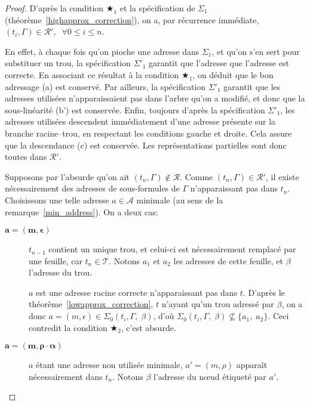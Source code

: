 \documentclass[11pt,a4paper]{article}
\theoremstyle{plain}
\theoremstyle{definition}
\theoremstyle{remark}
\newcommand*{\someadd}{\rho}
\newcommand*{\sequent}{\Gamma}
\newcommand*{\addresses}{\ensuremath{\mathcal{A}}}
\newcommand*{\trees}{\ensuremath{\mathcal{T}}}
\newcommand*{\representations}{\ensuremath{\mathcal{R}}}
\newcommand*{\representationspartial}{\ensuremath{\mathcal{R'}}}
\newcommand*{\lowapprox}{\ensuremath{\Sigma_0}}
\newcommand*{\highapprox}{\ensuremath{\Sigma_1}}
\newcommand*{\highapproxspec}{\ensuremath{\Sigma'_1}}
\newcommand*{\caddpartial}{(a)}
\newcommand*{\clinpartial}{(b')}
\newcommand*{\cdespartial}{(c)}
\newcommand*{\exactcond}{\bigstar_1}
\newcommand*{\exactcondbis}{\bigstar_2}
\begin{document}
\begin{proof}
    D'après la condition $\exactcond$ et la spécification de $\highapprox$ (théorème~\ref{highapprox_correction}), on a, par récurrence immédiate, $(t_i, \sequent) \in \representationspartial, \; \; \forall 0 \leq i \leq n$.
    
    En effet, à chaque fois qu'on pioche une adresse dans $\highapprox$, et qu'on s'en sert pour substituer un trou, la spécification $\highapproxspec$ garantit que l'adresse que l'adresse est correcte. En associant ce résultat à la condition $\exactcond$, on déduit que le bon adressage \caddpartial{} est conservé. Par ailleurs, la spécification $\highapproxspec$ garantit que les adresses utilisées n'apparaissaient pas dans l'arbre qu'on a modifié, et donc que la sous-linéarité \clinpartial{} est conservée. Enfin, toujours d'après la spécification $\highapproxspec$, les adresses utilisées descendent immédiatement d'une adresse présente sur la branche racine--trou, en respectant les conditions gauche et droite. Cela assure que la descendance \cdespartial{} est conservée. Les représentations partielles sont donc toutes dans $\representationspartial$.

    Supposons par l'absurde qu'on ait $(t_n, \sequent) \notin \representations$. Comme $(t_n, \sequent) \in \representationspartial$, il existe nécessairement des adresses de sous-formules de $\sequent$ n'apparaissant pas dans $t_n$. Choisissons une telle adresse $a \in \addresses$ minimale (au sens de la remarque~\ref{min_address}). On a deux cas:

    \begin{description}
        \item[$\bm{a = (m, \epsilon)}$] $t_{n-1}$ contient un unique trou, et celui-ci est nécessairement remplacé par une feuille, car $t_n \in \trees$. Notons $a_1$ et $a_2$ les adresses de cette feuille, et $\beta$ l'adresse du trou.
        
        $a$ est une adresse racine correcte n'apparaissant pas dans $t$. D'après le théorème~\ref{lowapprox_correction}, $t$ n'ayant qu'un trou adressé par $\beta$, on a donc $a = (m, \epsilon) \in \lowapprox(t_i, \sequent, \; \beta)$, d'où $\lowapprox(t_i, \sequent, \; \beta) \nsubseteq \{a_1, \; a_2\}$.
        Ceci contredit la condition $\exactcondbis$, c'est absurde.

        \item[$\bm{a = (m, \someadd \cdot \alpha)}$] $a$ étant une adresse non utilisée minimale, $a' = (m, \someadd)$ apparaît nécessairement dans $t_n$. Notons $\beta$ l'adresse du n\oe ud étiqueté par $a'$.


\end{description}
\end{proof}
\end{document}
